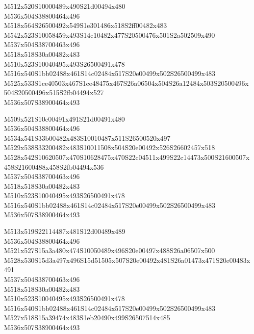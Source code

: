 \documentclass{article}
\begin{document}
\begin{multicols}{5}
\begin{center}

M512x520S10000489x490S21d00494x480 %
\\M536x504S38800464x496 %
\\M518x564S26500492x549S1e301486x518S2ff00482x483 %
\\M542x523S10058459x493S14c10482x477S20500476x501S2a502509x490 %
\\M537x504S38700463x496 %
\\M518x518S30a00482x483 %
\\M510x523S10040495x493S26500491x478 %
\\M516x540S1bb02488x461S14c02484x517S20e00499x502S26500499x483 %
\\M525x533S1ce40503x467S1ce48475x467S26a06504x504S26a12484x503S20500496x504S20500496x515S2fb04494x527 %
\\M536x507S38900464x493 %
\vfil
\columnbreak

M509x521S10e00491x491S21d00491x480 %
\\M536x504S38800464x496 %
\\M534x541S33b00482x483S10010487x511S26500520x497 %
\\M529x538S33200482x483S10011508x504S20e00492x526S26602457x518 %
\\M528x542S10620507x470S10628475x470S22c04511x499S22c14473x500S21600507x458S21600488x458S2fb04494x536 %
\\M537x504S38700463x496 %
\\M518x518S30a00482x483 %
\\M510x523S10040495x493S26500491x478 %
\\M516x540S1bb02488x461S14c02484x517S20e00499x502S26500499x483 %
\\M536x507S38900464x493 %
\vfil
\columnbreak

M513x519S22114487x481S12d00489x489 %
\\M536x504S38800464x496 %
\\M521x527S15a3a480x474S10050489x496S20e00497x488S26a06507x500 %
\\M528x530S15d3a497x496S15d51505x507S20e00492x481S26a01473x471S20e00483x491 %
\\M537x504S38700463x496 %
\\M518x518S30a00482x483 %
\\M510x523S10040495x493S26500491x478 %
\\M516x540S1bb02488x461S14c02484x517S20e00499x502S26500499x483 %
\\M527x518S15a39474x483S1eb20490x499S26507514x485 %
\\M536x507S38900464x493 %
\vfil
\columnbreak


\end{center}
\end{multicols}
\end{document}

